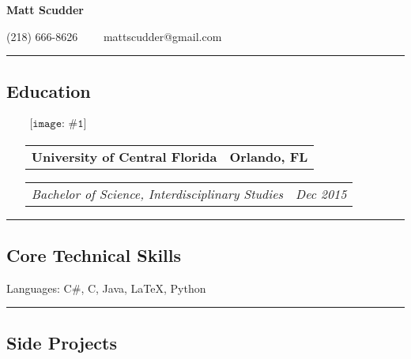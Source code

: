\documentclass[11pt,letterpaper]{article}
\makeatletter
\newenvironment{indentsection}[1]%
{\begin{list}{}%
	{\setlength{\leftmargin}{#1}}%
	\item[]%
}
{\end{list}}
\newcommand{\headerrow}[2]
{\begin{tabular*}{\linewidth}{l@{\extracolsep{\fill}}r}
	#1 &
	#2 \\
\end{tabular*}}
\newcommand{\centeredicon}[1]
	{$\begin{array}{r}
	\texttt{[image: \#1]}
	\end{array}$}
\makeatother
\begin{document}
\begin{center}
{\Huge \textbf{Matt Scudder}}

(218) 666-8626\ \ \textbullet
\ \ mattscudder@gmail.com
\end{center}

\hrule
\vspace{-0.4em}
\subsection*{Education}
\begin{itemize}
	\parskip=0.1em
	\item[\centeredicon{diploma.png}]
	\headerrow
		{\textbf{University of Central Florida}}
		{\textbf{Orlando, FL}}
	\headerrow
		{\emph{Bachelor of Science, Interdisciplinary Studies}}
		{\emph{Dec 2015}}




\end{itemize}






\hrule
\vspace{-0.4em}
\subsection*{Core Technical Skills}

\begin{indentsection}{\parindent}
\begin{description*}
	\item[Languages:]
	C\#, C, Java, \LaTeX, Python
\end{description*}
\end{indentsection}

\hrule
\vspace{-0.4em}
\subsection*{Side Projects}
\end{document}
